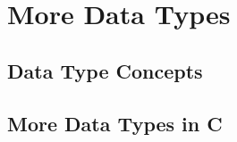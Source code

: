 \chapter{More Data Types} %
\label{cha:more_data_types}

\minitoc

\section{Data Type Concepts} %
\label{sec:data_type_concepts}










\clearpage
\section{More Data Types in C} %
\label{sec:more_data_types_in_c}











